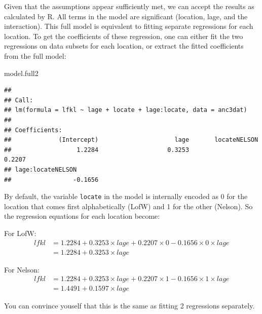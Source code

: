 \documentclass[
  12pt,
]{book}
\newenvironment{Shaded}{\begin{snugshade}}{\end{snugshade}}
\newcommand{\ControlFlowTok}[1]{\textcolor[rgb]{0.13,0.29,0.53}{\textbf{#1}}}
\newcommand{\DataTypeTok}[1]{\textcolor[rgb]{0.13,0.29,0.53}{#1}}
\newcommand{\KeywordTok}[1]{\textcolor[rgb]{0.13,0.29,0.53}{\textbf{#1}}}
\newcommand{\NormalTok}[1]{#1}
\newcommand{\OperatorTok}[1]{\textcolor[rgb]{0.81,0.36,0.00}{\textbf{#1}}}
\begin{document}
Given that the assumptions appear sufficiently met, we can accept the results as calculated by R. All terms in the model are significant (location, lage, and the interaction). This full model is equivalent to fitting separate regressions for each location. To get the coefficients of these regression, one can either fit the two regressions on data subsets for each location, or extract the fitted coefficients from the
full model:

\begin{Shaded}
\begin{Highlighting}[]
\NormalTok{model.full2}
\end{Highlighting}
\end{Shaded}

\begin{verbatim}
## 
## Call:
## lm(formula = lfkl ~ lage + locate + lage:locate, data = anc3dat)
## 
## Coefficients:
##             (Intercept)                     lage       locateNELSON        
##                  1.2284                   0.3253                   0.2207  
## lage:locateNELSON        
##                 -0.1656
\end{verbatim}

By default, the variable \texttt{locate} in the model is internally encoded as 0 for the location that comes first alphabetically (LofW) and 1 for the other (Nelson). So the regression equations for each location become:

For LofW:
\[\begin{aligned}
lfkl &= 1.2284 + 0.3253 \times lage + 0.2207 \times 0 - 0.1656 \times 0 \times lage \\
 &= 1.2284 + 0.3253 \times lage
\end{aligned}\]

For Nelson:
\[\begin{aligned}
lfkl &= 1.2284 + 0.3253 \times lage + 0.2207 \times 1 - 0.1656 \times 1 \times lage \\
 &= 1.4491 + 0.1597 \times lage
\end{aligned}\]

You can convince youself that this is the same as fitting 2 regressions
separately.

\begin{Shaded}
\end{Shaded}
\end{document}

